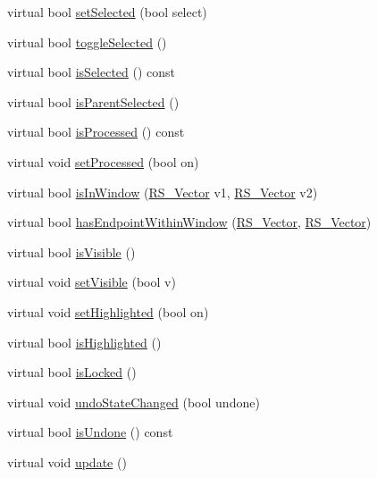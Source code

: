 \begin{DoxyCompactItemize}
\item 
virtual bool \hyperlink{class_r_s___entity_aceba388bf00564dee06a0637bfe2ff1e}{set\-Selected} (bool select)
\item 
virtual bool \hyperlink{class_r_s___entity_a401a22e8370e24b48122a68f48276a12}{toggle\-Selected} ()
\item 
virtual bool \hyperlink{class_r_s___entity_a5a4c2c6e7256f806e14e943cfab489a4}{is\-Selected} () const 
\item 
virtual bool \hyperlink{class_r_s___entity_a2af2c7fc19d747e9a0a30d231fabcfef}{is\-Parent\-Selected} ()
\item 
virtual bool \hyperlink{class_r_s___entity_a8848c9c90453c2d6374064e95e04ebb1}{is\-Processed} () const 
\item 
virtual void \hyperlink{class_r_s___entity_afa0c71edb9f082300cad7837bd6e6119}{set\-Processed} (bool on)
\item 
virtual bool \hyperlink{class_r_s___entity_a6f89d89e4eb13677fbbd4b099a7c3d33}{is\-In\-Window} (\hyperlink{class_r_s___vector}{R\-S\-\_\-\-Vector} v1, \hyperlink{class_r_s___vector}{R\-S\-\_\-\-Vector} v2)
\item 
virtual bool \hyperlink{class_r_s___entity_a922d0244cefadbe58e9ae15deedb3018}{has\-Endpoint\-Within\-Window} (\hyperlink{class_r_s___vector}{R\-S\-\_\-\-Vector}, \hyperlink{class_r_s___vector}{R\-S\-\_\-\-Vector})
\item 
virtual bool \hyperlink{class_r_s___entity_a8f3b3e737e0aad9aaa9955ec2562840d}{is\-Visible} ()
\item 
virtual void \hyperlink{class_r_s___entity_acd5003def05192ad771d2748083108a2}{set\-Visible} (bool v)
\item 
virtual void \hyperlink{class_r_s___entity_ab31b59c486b0738fd0f7fbda3c192c2f}{set\-Highlighted} (bool on)
\item 
virtual bool \hyperlink{class_r_s___entity_a575d3f8f9ddb82d957f0ee3e75f18c1c}{is\-Highlighted} ()
\item 
virtual bool \hyperlink{class_r_s___entity_afd8183acddcd7a09ac7ab3ea30f62c8f}{is\-Locked} ()
\item 
virtual void \hyperlink{class_r_s___entity_acba674d686d5a1c996e96dc4fc7e9c6b}{undo\-State\-Changed} (bool undone)
\item 
virtual bool \hyperlink{class_r_s___entity_a2e7330de9ecb41795c9972d3eb791739}{is\-Undone} () const 
\item 
virtual void \hyperlink{class_r_s___entity_a018828249d58b2f610f01c726a3c4fdc}{update} ()
\item 

\end{DoxyCompactItemize}

